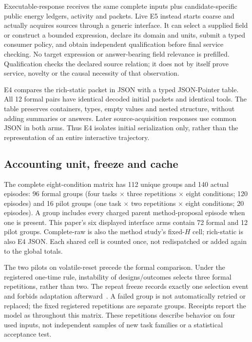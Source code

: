 Executable-response receives the same complete inputs plus candidate-specific
public energy ledgers, activity and packets. Live E5 instead starts coarse and
actually acquires sources through a generic interface. It can select a supplied
field or construct a bounded expression, declare its domain and units, submit
a typed consumer policy, and obtain independent qualification before final
service checking. No target expression or answer-bearing field relevance is
prefilled. Qualification checks the declared source relation; it does not by
itself prove service, novelty or the causal necessity of that observation.

E4 compares the rich-static packet in JSON with a typed JSON-Pointer table.
All 12 formal pairs have identical decoded initial packets and identical tools.
The table preserves containers, types, empty values and nested structure,
without adding summaries or answers. Later source-acquisition responses use
common JSON in both arms. Thus E4 isolates initial serialization only, rather
than the representation of an entire interactive trajectory.

\subsection{Accounting unit, freeze and cache}
The complete eight-condition matrix has 112 unique groups and 140 actual episodes:
96 formal groups (four tasks $\times$ three repetitions $\times$ eight conditions;
120 episodes) and 16 pilot groups (one task $\times$ two repetitions
$\times$ eight conditions; 20 episodes). A group includes every charged parent
method-proposal episode when one is present. This paper's six displayed interface
arms contain 72 formal and 12 pilot groups. Complete-raw is also the method
study's fixed-$H$ cell; rich-static is also E4 JSON. Each shared cell is counted
once, not redispatched or added again to the global totals.

The two pilots on volatile-reset precede the formal comparison. Under the
registered one-time rule, instability of designs/outcomes selects three formal
repetitions, rather than two. The repeat freeze records exactly one selection
event and forbids adaptation afterward~\cite{freeze}. A failed group is not
automatically retried or replaced; the fixed registered repetitions are separate
groups. Receipts report the model as  throughout this matrix.
These repetitions describe behavior on four used inputs, not independent samples
of new task families or a statistical acceptance test.

